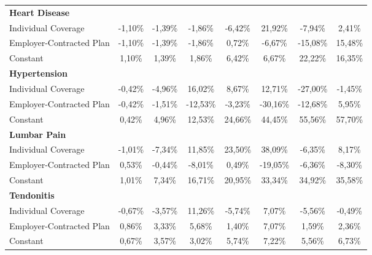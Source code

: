 \documentclass{article}
\begin{document}
\begin{table*}
{\begin{tabular}{l*{7}{c}}
\midrule
\textbf{Heart Disease} & & & & & & & \\

Individual Coverage 	&  -1,10\%\sym{***}&  -1,39\%\sym{*}  &  -1,86\%\sym{**} &  -6,42\%\sym{***}&  21,92\%         &  -7,94\%         &   2,41\%         \\
Employer-Contracted Plan&  -1,10\%\sym{***}&  -1,39\%\sym{*}  &  -1,86\%\sym{**} &   0,72\%         &  -6,67\%\sym{***}& -15,08\%         &  15,48\%         \\
Constant            	&   1,10\%\sym{***}&   1,39\%\sym{*}  &   1,86\%\sym{**} &   6,42\%\sym{***}&   6,67\%\sym{***}&  22,22\%\sym{***}&  16,35\%\sym{***}\\

\midrule
\textbf{Hypertension} & & & & & & & \\

Individual Coverage 	&  -0,42\%\sym{*}  &  -4,96\%\sym{***}&  16,02\%         &   8,67\%         &  12,71\%         & -27,00\%         &  -1,45\%         \\
Employer-Contracted Plan&  -0,42\%\sym{*}  &  -1,51\%         & -12,53\%\sym{***}&  -3,23\%         & -30,16\%\sym{*}  & -12,68\%         &   5,95\%         \\
Constant            	&   0,42\%\sym{*}  &   4,96\%\sym{***}&  12,53\%\sym{***}&  24,66\%\sym{***}&  44,45\%\sym{***}&  55,56\%\sym{***}&  57,70\%\sym{***}\\

\midrule
\textbf{Lumbar Pain} & & & & & & & \\

Individual Coverage 	&  -1,01\%\sym{**} &  -7,34\%\sym{***}&  11,85\%         &  23,50\%         &  \cellcolor[gray]{0.9} 38,09\%\sym{*}  &  -6,35\%         &   8,17\%         \\
Employer-Contracted Plan&   0,53\%         &  -0,44\%         &  -8,01\%         &   0,49\%         & -19,05\%         &  -6,36\%         &  -8,30\%         \\
Constant            	&   1,01\%\sym{**} &   7,34\%\sym{***}&  16,71\%\sym{***}&  20,95\%\sym{***}&  33,34\%\sym{***}&  34,92\%\sym{***}&  35,58\%\sym{***}\\

\midrule
\textbf{Tendonitis} & & & & & & & \\

Individual Coverage 	&  -0,67\%\sym{*}  &  -3,57\%\sym{***}&  11,26\%         &  -5,74\%\sym{***}&   7,07\%         &  -5,56\%\sym{**} &  -0,49\%         \\
Employer-Contracted Plan&   0,86\%         &   3,33\%         &   5,68\%         &   1,40\%         &   7,07\%         &   1,59\%         &   2,36\%         \\
Constant            	&   0,67\%\sym{*}  &   3,57\%\sym{***}&   3,02\%\sym{***}&   5,74\%\sym{***}&   7,22\%\sym{***}&   5,56\%\sym{**} &   6,73\%\sym{**} \\


\end{tabular}}
\end{table*}
\end{document}
